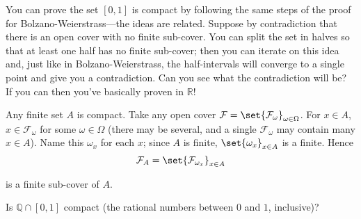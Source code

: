 \documentclass{article}
\begin{document}
\begin{remark}
  You can prove the set $[0, 1]$ is compact by following the same steps of the proof for Bolzano-Weierstrass---the ideas are related. Suppose by contradiction that there is an open cover with no finite sub-cover. You can split the set in halves so that at least one half has no finite sub-cover; then you can iterate on this idea and, just like in Bolzano-Weierstrass, the half-intervals will converge to a single point and give you a contradiction. Can you see what the contradiction will be? If you can then you've basically proven  in $\mathbb{R}$!
\end{remark}

\begin{remark}
  Any finite set $A$ is compact. Take any open cover $\mathcal{F} = \set{\mathcal{F}_\omega}_{\omega \in \Omega}$. For $x \in A$, $x \in \mathcal{F}_\omega$ for some $\omega \in \Omega$ (there may be several, and a single $\mathcal{F}_\omega$ may contain many $x \in A$). Name this $\omega_x$ for each $x$; since $A$ is finite, $\set{\omega_x}_{x \in A}$ is a finite. Hence
  \[
    \mathcal{F}_A = \set{\mathcal{F}_{\omega_x}}_{x \in A}
  \]

  is a finite sub-cover of $A$.
\end{remark}

Is $\mathbb{Q} \cap [0, 1]$ compact (the rational numbers between $0$ and $1$, inclusive)?
\end{document}
